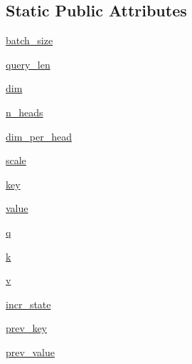 \subsection*{Static Public Attributes}
\begin{DoxyCompactItemize}
\item 
\hyperlink{classparlai_1_1agents_1_1transformer_1_1modules_1_1MultiHeadAttention_a99f2e28c8a369a07a2982562391c1480}{batch\+\_\+size}
\item 
\hyperlink{classparlai_1_1agents_1_1transformer_1_1modules_1_1MultiHeadAttention_a100f3e07166c020ba43691ab0935b194}{query\+\_\+len}
\item 
\hyperlink{classparlai_1_1agents_1_1transformer_1_1modules_1_1MultiHeadAttention_a0ffd2e0d89db2f682561af438aaa1eb5}{dim}
\item 
\hyperlink{classparlai_1_1agents_1_1transformer_1_1modules_1_1MultiHeadAttention_aa28ff3887a718bb96a9bd27c938a0baf}{n\+\_\+heads}
\item 
\hyperlink{classparlai_1_1agents_1_1transformer_1_1modules_1_1MultiHeadAttention_a50cc6181bc0d24e9e20f820344faa5ec}{dim\+\_\+per\+\_\+head}
\item 
\hyperlink{classparlai_1_1agents_1_1transformer_1_1modules_1_1MultiHeadAttention_ae646637141fe94e312d080563f83ae5e}{scale}
\item 
\hyperlink{classparlai_1_1agents_1_1transformer_1_1modules_1_1MultiHeadAttention_a39d1a56edfde6dd1af7cdd73d33c869a}{key}
\item 
\hyperlink{classparlai_1_1agents_1_1transformer_1_1modules_1_1MultiHeadAttention_a16e1973304e7a76af3293daa82e2f17a}{value}
\item 
\hyperlink{classparlai_1_1agents_1_1transformer_1_1modules_1_1MultiHeadAttention_a14e312fdb4882f9f3dc730c08673aa54}{q}
\item 
\hyperlink{classparlai_1_1agents_1_1transformer_1_1modules_1_1MultiHeadAttention_acdf6ff5307055074178f77080196d42e}{k}
\item 
\hyperlink{classparlai_1_1agents_1_1transformer_1_1modules_1_1MultiHeadAttention_a96d6455bac45c0ebf237863d9f292fc1}{v}
\item 
\hyperlink{classparlai_1_1agents_1_1transformer_1_1modules_1_1MultiHeadAttention_aa5b5049ad1310575ef39a2221dc98867}{incr\+\_\+state}
\item 
\hyperlink{classparlai_1_1agents_1_1transformer_1_1modules_1_1MultiHeadAttention_abd21d573bbd199c212823d195b1cc70d}{prev\+\_\+key}
\item 
\hyperlink{classparlai_1_1agents_1_1transformer_1_1modules_1_1MultiHeadAttention_abfd84c6f81cbcf82f2dc576cd2fd634d}{prev\+\_\+value}

\end{DoxyCompactItemize}
